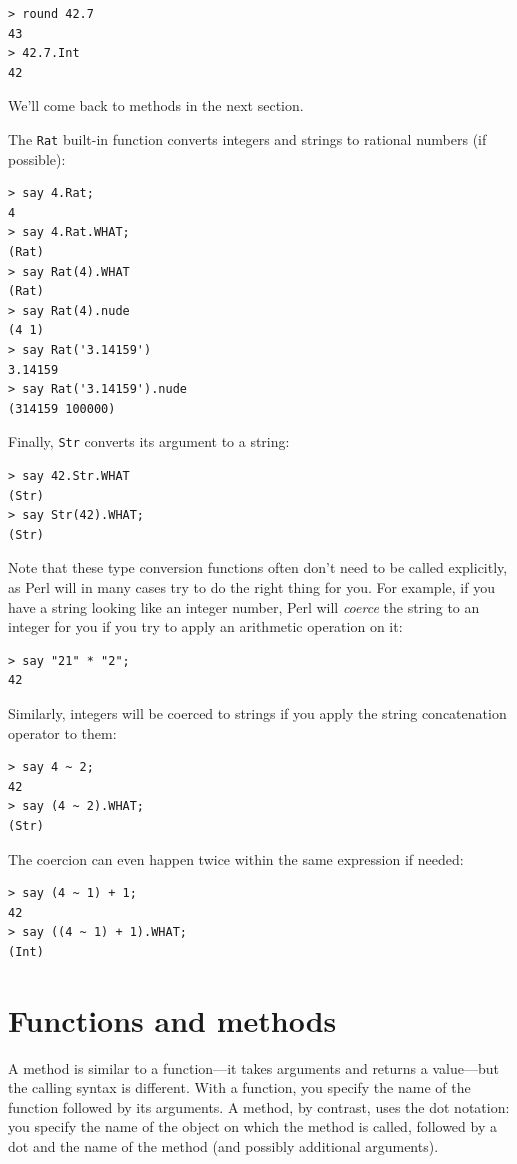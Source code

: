 \begin{verbatim}
> round 42.7
43
> 42.7.Int
42
\end{verbatim}

We'll come back to methods in the next section.

The {\tt Rat} built-in function converts integers and 
strings to rational numbers (if possible):

\begin{verbatim}
> say 4.Rat;
4
> say 4.Rat.WHAT;
(Rat)
> say Rat(4).WHAT
(Rat)
> say Rat(4).nude
(4 1)
> say Rat('3.14159')
3.14159
> say Rat('3.14159').nude
(314159 100000)
\end{verbatim}
%
Finally, {\tt Str} converts its argument to a string:

\begin{verbatim}
> say 42.Str.WHAT
(Str)
> say Str(42).WHAT;
(Str)
\end{verbatim}

Note that these type conversion functions often don't need 
to be called explicitly, as Perl will in many cases try to do the 
right thing for you. For example, if you have a string 
looking like an integer number, Perl will \emph{coerce} 
the string to an integer for you if you try to apply 
an arithmetic operation on it:

\begin{verbatim}
> say "21" * "2";
42
\end{verbatim}

Similarly, integers will be coerced to strings if you 
apply the string concatenation operator to them:

\begin{verbatim}
> say 4 ~ 2;
42
> say (4 ~ 2).WHAT;
(Str)
\end{verbatim}

The coercion can even happen twice within the same expression 
if needed:

\begin{verbatim}
> say (4 ~ 1) + 1;
42
> say ((4 ~ 1) + 1).WHAT;
(Int)
\end{verbatim}

\section{Functions and methods}

A method is similar to a function---it takes arguments and
returns a value---but the calling syntax is different. With 
a function, you specify the name of the function followed 
by its arguments. A method, by contrast, uses the dot 
notation: you specify the name of the object on which 
the method is called, followed by a dot and the name of 
the method (and possibly additional arguments).

